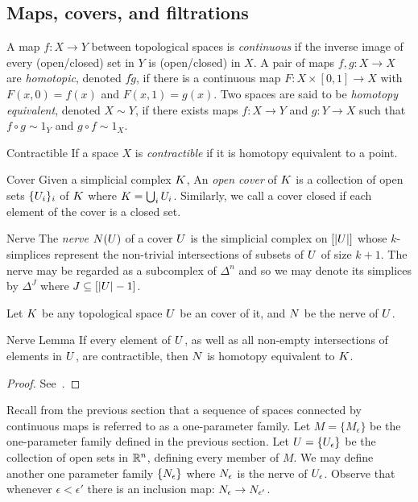 \subsection{Maps, covers, and filtrations}
\begin{definition}
A map $f: X \rightarrow Y$ between topological spaces is \emph{continuous} if the inverse image of every (open/closed) set in $Y$ is (open/closed) in $X$. A pair of maps $f,g: X \rightarrow X$ are \emph{homotopic}, denoted $f \tilde g$, if there is a continuous map $F: X \times [0,1] \rightarrow X$ with $F(x,0) = f(x)$ and $F(x,1) = g(x)$. 
Two spaces are said to be \emph{homotopy equivalent}, denoted $X \sim Y$, if there exists maps $f: X \rightarrow Y$ and $g: Y \rightarrow X$ such that $f \circ g \sim 1_Y$ and $g \circ f \sim 1_X$.
\end{definition}

\begin{definition}{Contractible}
If a space $X$ is \emph{contractible} if it is homotopy equivalent to a point.
\end{definition}

\begin{definition}{Cover}
Given a simplicial complex $K$, An \emph{open cover} of $K$ is a collection of open sets $\{U_i\}_i$ of $K$ where $K = \bigcup_i U_i$. Similarly, we call a cover closed if each element of the cover is a closed set.
\end{definition}

\begin{definition}{Nerve}
The \emph{nerve} $N(U)$ of a cover $U$ is the simplicial complex on $[|U|]$ whose $k$-simplices represent the non-trivial intersections of subsets of $U$ of size $k+1$. The nerve may be regarded as a subcomplex of $\Delta^n$ and so we may denote its simplices by $\Delta^J$ where $J \subseteq [|U|-1]$.
\end{definition}

Let $K$ be any topological space $U$ be an cover of it, and $N$ be the nerve of $U$. 
\begin{lemma}{Nerve Lemma}
If every element of $U$, as well as all non-empty intersections of elements in $U$, are contractible, then $N$ is homotopy equivalent to $K$.
\end{lemma}
\begin{proof}
See~\cite{hatcher}.
\end{proof}

Recall from the previous section that a sequence of spaces connected by continuous maps is referred to as a one-parameter family. Let $M = \{M_\epsilon\}$ be the one-parameter family defined in the previous section. Let $U = \{U_\epsilon\}$ be the collection of open sets in $\mathbb{R}^n$, defining every member of $M$. We may define another one parameter family $\{ N_\epsilon \}$ where $N_\epsilon$ is the nerve of $U_\epsilon$. Observe that whenever $\epsilon < \epsilon'$ there is an inclusion map: $N_\epsilon \rightarrow N_{\epsilon'}$.

